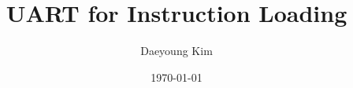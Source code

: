 \documentclass[11pt]{article}
\begin{document}
    \title{UART for Instruction Loading}
    \author{Daeyoung Kim}
    \date{\today}
    \maketitle

    
    
    
    
\end{document}
